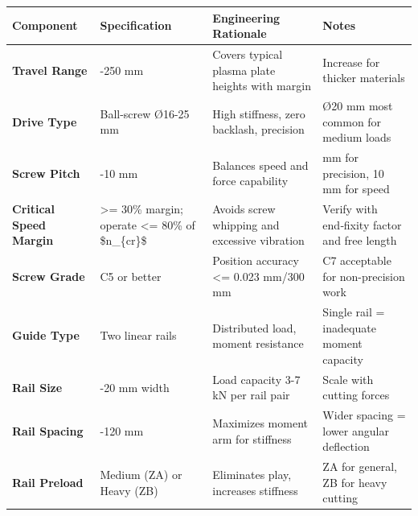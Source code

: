 \documentclass[
]{article}
\begin{document}
{\def\LTcaptype{} %
\begin{longtable}[]{@{}
  >{\raggedright\arraybackslash}p{}
  >{\raggedright\arraybackslash}p{}
  >{\raggedright\arraybackslash}p{}
  >{\raggedright\arraybackslash}p{}@{}}
\toprule\noalign{}
\begin{minipage}[b]{\linewidth}\raggedright
Component
\end{minipage} & \begin{minipage}[b]{\linewidth}\raggedright
Specification
\end{minipage} & \begin{minipage}[b]{\linewidth}\raggedright
Engineering Rationale
\end{minipage} & \begin{minipage}[b]{\linewidth}\raggedright
Notes
\end{minipage} \\
\midrule\noalign{}
\endhead
\bottomrule\noalign{}
\endlastfoot
\textbf{Travel Range} & 150-250 mm & Covers typical plasma plate heights
with margin & Increase for thicker materials \\
\textbf{Drive Type} & Ball-screw Ø16-25 mm & High stiffness, zero
backlash, precision & Ø20 mm most common for medium loads \\
\textbf{Screw Pitch} & 5-10 mm & Balances speed and force capability & 5
mm for precision, 10 mm for speed \\
\textbf{Critical Speed Margin} & \textgreater= 30\% margin; operate
\textless= 80\% of \$n\_\{cr\}\$ & Avoids screw whipping and excessive
vibration & Verify with end‑fixity factor and free length \\
\textbf{Screw Grade} & C5 or better & Position accuracy \textless= 0.023
mm/300 mm & C7 acceptable for non-precision work \\
\textbf{Guide Type} & Two linear rails & Distributed load, moment
resistance & Single rail = inadequate moment capacity \\
\textbf{Rail Size} & 15-20 mm width & Load capacity 3-7 kN per rail pair
& Scale with cutting forces \\
\textbf{Rail Spacing} & 80-120 mm & Maximizes moment arm for stiffness &
Wider spacing = lower angular deflection \\
\textbf{Rail Preload} & Medium (ZA) or Heavy (ZB) & Eliminates play,
increases stiffness & ZA for general, ZB for heavy cutting \\

\end{longtable}}
\end{document}
